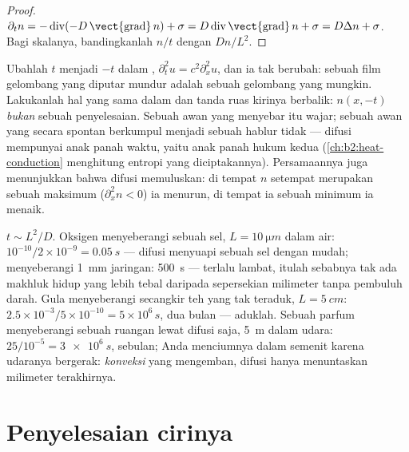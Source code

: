 \begin{proof}
$\partial_t n = -\operatorname{div}(-D\,\vect{\operatorname{grad}}\,n) +
\sigma = D\operatorname{div}\vect{\operatorname{grad}}\,n + \sigma = D\Delta
n + \sigma$. Bagi skalanya, bandingkanlah $n/t$ dengan $Dn/L^2$.
\end{proof}

\begin{remark}\label{rem:b2:particle-diffusion:irreversible}
Ubahlah $t$ menjadi $-t$ dalam , $\partial_t^2 u = c^2
\partial_x^2 u$, dan ia tak berubah: sebuah film gelombang yang diputar mundur adalah
sebuah gelombang yang mungkin. Lakukanlah hal yang sama dalam  dan tanda
ruas kirinya berbalik: $n(x,-t)$ \emph{bukan} sebuah penyelesaian. Sebuah awan yang
menyebar itu wajar; sebuah awan yang secara spontan berkumpul menjadi sebuah hablur
tidak --- difusi mempunyai anak panah waktu, yaitu anak panah hukum kedua
(\cref{ch:b2:heat-conduction} menghitung entropi yang diciptakannya). Persamaannya
juga menunjukkan bahwa difusi memuluskan: di tempat $n$ setempat merupakan sebuah
maksimum ($\partial_x^2 n < 0$) ia menurun, di tempat ia sebuah minimum ia
menaik.
\end{remark}

\begin{example}\label{ex:b2:particle-diffusion:times}
$t \sim L^2/D$. Oksigen menyeberangi sebuah sel, $L = \qty{10}{\micro m}$ dalam air:
$10^{-10}/2 \times 10^{-9} = \qty{0.05}{s}$ --- difusi menyuapi sebuah sel dengan
mudah; menyeberangi \qty{1}{mm} jaringan: \qty{500}{s} --- terlalu lambat, itulah
sebabnya tak ada makhluk hidup yang lebih tebal daripada sepersekian milimeter tanpa
pembuluh darah. Gula menyeberangi secangkir teh yang tak teraduk, $L = \qty{5}{cm}$:
$2.5 \times 10^{-3}/5 \times 10^{-10} = 5 \times 10^6\,\unit{s}$, dua bulan
--- aduklah. Sebuah parfum menyeberangi sebuah ruangan lewat difusi saja, \qty{5}{m} dalam
udara: $25/10^{-5} = \qty{3e6}{s}$, sebulan; Anda menciumnya dalam semenit
karena udaranya bergerak: \emph{konveksi} yang mengemban, difusi hanya
menuntaskan milimeter terakhirnya.
\end{example}

\section{Penyelesaian cirinya}


